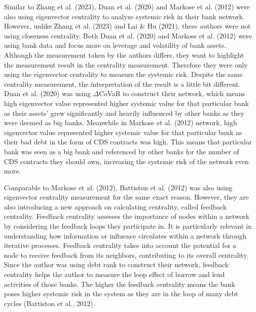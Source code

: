 \documentclass[a4paper,11pt]{article}
\begin{document}
Similar to Zhang et al. (2023), Duan et al. (2020) and Markose et al. (2012) were also using eigenvector centrality to analyze systemic risk in their bank network. However, unlike Zhang et al. (2023) and Lai \& Hu (2021), these authors were not using closeness centrality. Both Duan et al. (2020) and Markose et al. (2012) were using bank data and focus more on leverage and volatility of bank assets. Although the measurement taken by the authors differs, they want to highlight the measurement result in the centrality measurement. Therefore they were only using the eigenvector centrality to measure the systemic risk. Despite the same centrality measurement, the interpretation of the result is a little bit different. Duan et al. (2020) was using $\Delta$CoVaR to construct their network, which means high eigenvector value represented higher systemic value for that particular bank as their assets’ grew significantly and heavily influenced by other banks as they were deemed as big banks. Meanwhile in Markose et al. (2012) network, high eigenvector value represented higher systemic value for that particular bank as their bad debt in the form of CDS contracts was high. This means that particular bank was seen as a big bank and referenced by other banks for the number of CDS contracts they should own, increasing the systemic risk of the network even more.

Comparable to Markose et al. (2012), Battiston et al. (2012) was also using eigenvector centrality measurement for the same exact reason. However, they are also introducing a new approach on calculating centrality, called feedback centrality. Feedback centrality assesses the importance of nodes within a network by considering the feedback loops they participate in. It is particularly relevant in understanding how information or influence circulates within a network through iterative processes. Feedback centrality takes into account the potential for a node to receive feedback from its neighbors, contributing to its overall centrality. Since the author was using debt rank to construct their network, feedback centrality helps the author to measure the loop effect of borrow and lend activities of those banks. The higher the feedback centrality means the bank poses higher systemic risk in the system as they are in the loop of many debt cycles (Battiston et al., 2012).
\end{document}

